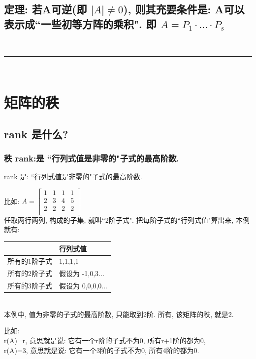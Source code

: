 \documentclass[UTF8]{ctexart}
\begin{document}
\subsection{定理: 若A可逆(即 $|A|\ne 0$), 则其充要条件是: A可以表示成``一些初等方阵的乘积". 即 $	A=P_1\cdot ...\cdot P_s	$}

~\\
\hrule
~\\


\section{矩阵的秩}

\subsection{rank 是什么? }

\subsubsection{秩 rank:是 ``行列式值是非零的"子式的最高阶数.}

rank 是: ``行列式值是非零的"子式的最高阶数.\\

\begin{myEnvSample}
比如: $A=\left[ \begin{matrix}
	1&		1&		1&		1\\
	2&		3&		4&		5\\
	2&		2&		2&		2\\
\end{matrix} \right]$\\

任取两行两列, 构成的子集, 就叫``2阶子式". 把每阶子式的``行列式值"算出来, 本例就有:\\
\begin{tabular}{|p{}|p{}|}
	\hline
	&  行列式值 \\
	\hline
所有的1阶子式	& 1,1,1,1 \\
	\hline
所有的2阶子式	& 假设为 -1,0,3... \\
\hline	
所有的3阶子式	& 假设为 0,0,0,0... \\
\hline		
\end{tabular}\\

本例中, 值为非零的子式的最高阶数, 只能取到2阶. 所有, 该矩阵的秩, 就是2.
\end{myEnvSample}

比如: \\
r(A)=r, 意思就是说: 它有一个r阶的子式不为0, 所有r+1阶的都为0, \\
r(A)=3, 意思就是说: 它有一个3阶的子式不为0, 所有4阶的都为0. \\
\end{document}
